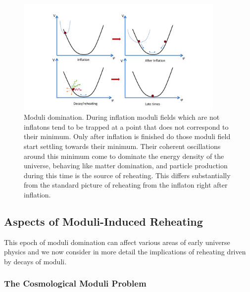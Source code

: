 \begin{figure}[ht]
    \centering
    \includegraphics[width = 0.9\textwidth]{Sections/Figures/FigureModuliDomination.pdf} 
    \caption{Moduli domination. During inflation moduli fields which are not inflatons tend to be trapped at a point that does not correspond to their minimum. Only after inflation is finished do those moduli field start settling towards their minimum. Their coherent oscillations around this minimum come to dominate the energy density of the universe, behaving like matter domination, and particle production during this time is the source of reheating. This differs substantially from the standard picture of reheating from the inflaton right after inflation.}
    \label{fig:ModuliDomination}
\end{figure}




\subsection{Aspects of Moduli-Induced Reheating}

This epoch of moduli domination can affect various areas of early universe physics and
we now consider in more detail the implications of reheating driven by decays of moduli.

\subsubsection{The Cosmological Moduli Problem}

